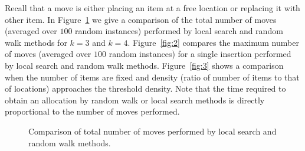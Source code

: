 Recall that a move is either placing an item at a free location or replacing it with other item. 
In Figure~\ref{fig:1} we give a comparison of the total number of moves (averaged over $100$ random instances) performed by local search and random walk methods for $k=3$ and $k=4$. Figure~\ref{fig:2} compares the maximum number of moves (averaged over $100$ random instances) for a single insertion performed by local search and random walk methods. Figure~\ref{fig:3} shows a comparison when the number of items are fixed and density (ratio of number of items to that of locations) approaches the threshold density. Note that the time required to obtain an allocation by random walk or local search methods is directly proportional to the number of moves performed. 
\begin{figure}[h!]
   \centering  
   \quad
     \vspace{-8pt}
   \caption{Comparison of total number of moves performed by local search and random walk methods.}
   \label{fig:1}
\end{figure}
